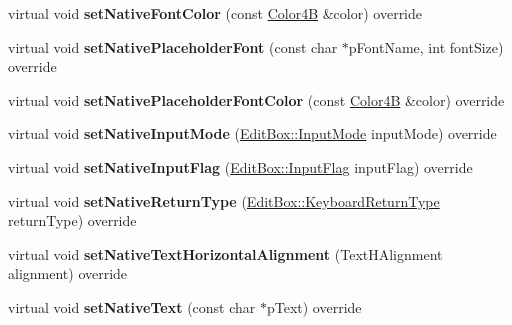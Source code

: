 \begin{DoxyCompactItemize}
\item 
\mbox{\label{classui_1_1EditBoxImplWin_acd38f5435c521e5a8dd3d2fcbc0648e5}} 
virtual void {\bfseries set\+Native\+Font\+Color} (const \hyperlink{structColor4B}{Color4B} \&color) override
\item 
\mbox{\label{classui_1_1EditBoxImplWin_a54a6eb29288c3ee011ff4c6eca86010d}} 
virtual void {\bfseries set\+Native\+Placeholder\+Font} (const char $\ast$p\+Font\+Name, int font\+Size) override
\item 
\mbox{\label{classui_1_1EditBoxImplWin_a51700617683a9a9fdc0a6cc5a58550ce}} 
virtual void {\bfseries set\+Native\+Placeholder\+Font\+Color} (const \hyperlink{structColor4B}{Color4B} \&color) override
\item 
\mbox{\label{classui_1_1EditBoxImplWin_a05a88fc2a8383ef51429995200a5b081}} 
virtual void {\bfseries set\+Native\+Input\+Mode} (\hyperlink{classui_1_1EditBox_a7a1bfe8f3ba218bedfcf5451ec3ce01a}{Edit\+Box\+::\+Input\+Mode} input\+Mode) override
\item 
\mbox{\label{classui_1_1EditBoxImplWin_a22b5dc5a4673341364d1fbf10fd1c866}} 
virtual void {\bfseries set\+Native\+Input\+Flag} (\hyperlink{classui_1_1EditBox_af02f13ee9fba51d59bb3111e200848c8}{Edit\+Box\+::\+Input\+Flag} input\+Flag) override
\item 
\mbox{\label{classui_1_1EditBoxImplWin_a58c09447c232e598e7e1b613c7efe4f2}} 
virtual void {\bfseries set\+Native\+Return\+Type} (\hyperlink{classui_1_1EditBox_a1e1285b6f742975b26bdeb8108ca6e51}{Edit\+Box\+::\+Keyboard\+Return\+Type} return\+Type) override
\item 
\mbox{\label{classui_1_1EditBoxImplWin_a4b1e22382b68dd88f4c4112da3d9c8b8}} 
virtual void {\bfseries set\+Native\+Text\+Horizontal\+Alignment} (Text\+H\+Alignment alignment) override
\item 
\mbox{\label{classui_1_1EditBoxImplWin_a7779cae810861fe860e1d3c72eae151e}} 
virtual void {\bfseries set\+Native\+Text} (const char $\ast$p\+Text) override

\end{DoxyCompactItemize}
